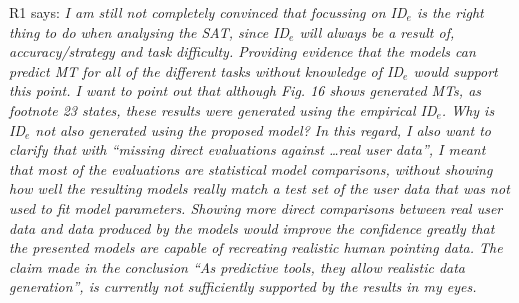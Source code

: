 \documentclass{article}
\begin{document}
R1 says: \textit{I am still not completely convinced that focussing on ID$_e$ is the right thing to do when analysing the SAT, since ID$_e$ will always be a result of, accuracy/strategy and task difficulty. Providing evidence that the models can predict MT for all of the different tasks without knowledge of ID$_e$ would support this point. I want to point out that although Fig. 16 shows generated MTs, as footnote 23 states, these results were generated using the empirical ID$_e$. Why is ID$_e$ not also generated using the proposed model?
In this regard, I also want to clarify that with “missing direct evaluations against \dots real user data”, I meant that most of the evaluations are statistical model comparisons, without showing how well the resulting models really match a test set of the user data that was not used to fit model parameters. Showing more direct comparisons between real user data and data produced by the models would improve the confidence greatly that the presented models are capable of recreating realistic human pointing data. The claim made in the conclusion “As predictive tools, they allow realistic data generation”, is currently not sufficiently supported by the results in my eyes.}
\end{document}
